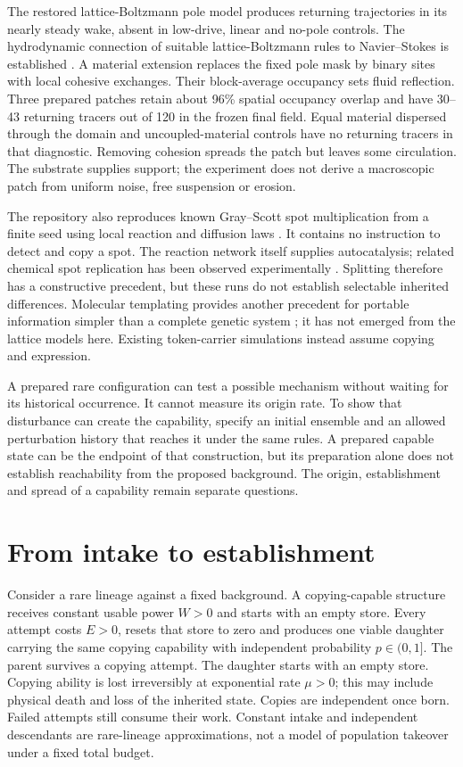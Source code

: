 \documentclass[11pt,a4paper]{article}
\begin{document}
The restored lattice-Boltzmann pole model produces returning trajectories in
its nearly steady wake, absent in low-drive, linear and no-pole controls.
The hydrodynamic connection of suitable lattice-Boltzmann rules to Navier--Stokes
is established \cite{lbm}. A material extension replaces the fixed pole mask by
binary sites with local cohesive exchanges. Their block-average occupancy sets
fluid reflection. Three prepared patches retain about 96\% spatial occupancy
overlap and have 30--43 returning tracers out of 120 in the frozen final field.
Equal material dispersed through the domain and uncoupled-material controls have
no returning tracers in that diagnostic. Removing cohesion spreads the patch
but leaves some circulation. The substrate supplies support; the experiment does
not derive a macroscopic patch from uniform noise, free suspension or erosion.

The repository also reproduces known Gray--Scott spot multiplication from a
finite seed using local reaction and diffusion laws \cite{pearson,spots}. It
contains no instruction to detect and copy a spot. The reaction network itself
supplies autocatalysis; related chemical spot replication has been observed
experimentally \cite{chemicalspots}. Splitting therefore has a constructive
precedent, but these runs do not establish selectable inherited differences.
Molecular templating provides another precedent for portable information simpler
than a complete genetic system \cite{peptide}; it has not emerged from the lattice
models here. Existing token-carrier simulations instead assume copying and expression.

A prepared rare configuration can test a possible mechanism without waiting for
its historical occurrence. It cannot measure its origin rate. To show that disturbance can create the capability, specify an initial ensemble
and an allowed perturbation history that reaches it under the same rules.
A prepared capable state can be the endpoint of that construction, but its
preparation alone does not establish reachability from the proposed background. The origin,
establishment and spread of a capability remain separate questions.

\section{From intake to establishment}

Consider a rare lineage against a fixed background. A copying-capable structure
receives constant usable power $W>0$ and starts with an empty store. Every attempt
costs $E>0$, resets that store to zero and produces one viable daughter carrying
the same copying capability with independent probability $p\in(0,1]$. The parent
survives a copying attempt. The daughter starts with an empty store. Copying ability
is lost irreversibly at exponential rate $\mu>0$; this may include physical death
and loss of the inherited state. Copies are independent once born. Failed attempts
still consume their work. Constant intake and independent descendants are rare-lineage
approximations, not a model of population takeover under a fixed total budget.
\end{document}
